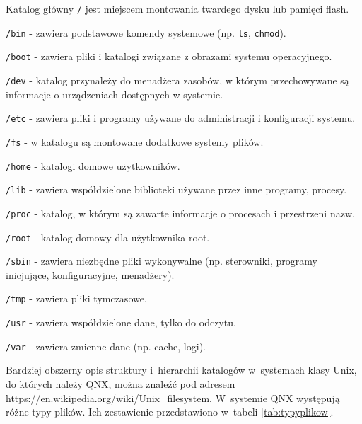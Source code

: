 \begin{myitemize}
\item Katalog główny \lstinline[style=MyBashStyle]{/} jest miejscem montowania twardego dysku lub pamięci flash.
\item \lstinline[style=MyBashStyle]{/bin} - zawiera podstawowe komendy systemowe (np. \lstinline[style=MyBashStyle]{ls}, \lstinline[style=MyBashStyle]{chmod}).
\item \lstinline[style=MyBashStyle]{/boot} - zawiera pliki i katalogi związane z obrazami systemu operacyjnego.
\item \lstinline[style=MyBashStyle]{/dev} - katalog przynależy do menadżera zasobów, w którym przechowywane są informacje o urządzeniach dostępnych w systemie.
\item \lstinline[style=MyBashStyle]{/etc} - zawiera pliki i programy używane do administracji i konfiguracji systemu.
\item \lstinline[style=MyBashStyle]{/fs} - w katalogu są montowane dodatkowe systemy plików.
\item \lstinline[style=MyBashStyle]{/home} - katalogi domowe użytkowników.
\item \lstinline[style=MyBashStyle]{/lib} - zawiera współdzielone biblioteki używane przez inne programy, procesy.
\item \lstinline[style=MyBashStyle]{/proc} - katalog, w którym są zawarte informacje o procesach i przestrzeni nazw.
\item \lstinline[style=MyBashStyle]{/root} - katalog domowy dla użytkownika root.
\item \lstinline[style=MyBashStyle]{/sbin} - zawiera niezbędne pliki wykonywalne (np. sterowniki, programy inicjujące, konfiguracyjne, menadżery).
\item \lstinline[style=MyBashStyle]{/tmp} - zawiera pliki tymczasowe.
\item \lstinline[style=MyBashStyle]{/usr} - zawiera współdzielone dane, tylko do odczytu.
\item \lstinline[style=MyBashStyle]{/var} - zawiera zmienne dane (np. cache, logi).
\end{myitemize}

Bardziej obszerny opis struktury i~hierarchii katalogów w~systemach klasy Unix, do których należy QNX, można znaleźć pod adresem \href{https://en.wikipedia.org/wiki/Unix\_filesystem}{https://en.wikipedia.org/wiki/Unix\_filesystem}. W~systemie QNX występują różne typy plików. Ich zestawienie przedstawiono w~tabeli \ref{tab:typyplikow}.


